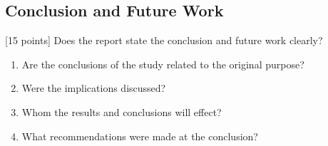 \documentclass{winslabreport}
\begin{document}
\subsection{Conclusion and Future Work}
[15 points] Does the report state the conclusion and future work clearly?
\begin{enumerate}
\item Are the conclusions of the study related to the original purpose?
\item Were the implications discussed?
\item Whom the results and conclusions will effect?
\item What recommendations were made at the conclusion?
\end{enumerate}
\end{document}

